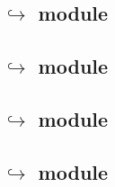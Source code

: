\subsection{\txnSystemDataMod{} $\hookrightarrow$ \wcpMod{} module}               \label{system transactions: lookups: wcp}                            
\subsection{\txnSystemDataMod{} $\hookrightarrow$ \eucMod{} module}               \label{system transactions: lookups: euc}                            
\subsection{\txnSystemDataMod{} $\hookrightarrow$ \btcMod{} module}               \label{system transactions: lookups: block data}                     
\subsection{\txnSystemDataMod{} $\hookrightarrow$ \hubMod{} module}               \label{system transactions: lookups: hub}                            
